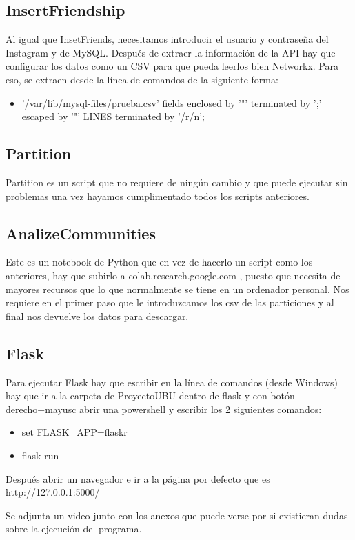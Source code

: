 \subsection{InsertFriendship}
Al igual que InsetFriends, necesitamos introducir el usuario y contraseña del Instagram y de MySQL.
Después de extraer la información de la API hay que configurar los datos como un CSV para que pueda leerlos bien Networkx. Para eso, se extraen desde la línea de comandos de la siguiente forma:
\begin{itemize}
    \item '/var/lib/mysql-files/prueba.csv' fields enclosed by '"' terminated by ';' escaped by '"' LINES terminated by '/r/n';
\end{itemize}


\subsection{Partition}
Partition es un script que no requiere de ningún cambio y que puede ejecutar sin problemas una vez hayamos cumplimentado todos los scripts anteriores.

\subsection{AnalizeCommunities}
Este es un notebook de Python que en vez de hacerlo un script como los anteriores, hay que subirlo a colab.research.google.com , puesto que necesita de mayores recursos que lo que normalmente se tiene en un ordenador personal. Nos requiere en el primer paso que le introduzcamos los csv de las particiones y al final nos devuelve los datos para descargar.

\subsection{Flask}
Para ejecutar Flask hay que escribir en la línea de comandos (desde Windows) hay que ir a la carpeta de ProyectoUBU dentro de flask y con botón derecho+mayusc abrir una powershell y escribir los 2 siguientes comandos:

\begin{itemize}
    \item set FLASK\_APP=flaskr
    \item flask run
\end{itemize}

Después abrir un navegador e ir a la página por defecto que es http://127.0.0.1:5000/

Se adjunta un video junto con los anexos que puede verse por si existieran dudas sobre la ejecución del programa.